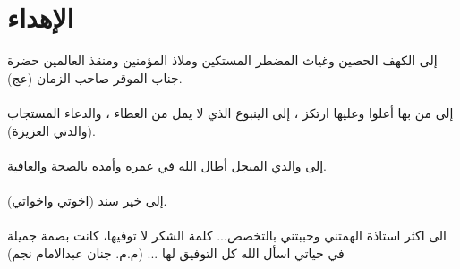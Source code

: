 \chapter*{الإهداء}
إلى الكهف الحصين وغياث المضطر المستكين وملاذ المؤمنين ومنقذ العالمين حضرة جناب الموقر صاحب الزمان (عج).\\
\\
إلى من بها أعلوا وعليها ارتكز ، إلى الينبوع الذي لا يمل من العطاء ، والدعاء المستجاب (والدتي العزيزة).\\
\\
إلى والدي المبجل أطال الله في عمره وأمده بالصحة والعافية.\\
\\
إلى خير سند (اخوتي واخواتي).\\
\\
الى اكثر استاذة الهمتني وحببتني بالتخصص... كلمة الشكر لا توفيها، كانت بصمة جميلة في حياتي اسأل الله كل التوفيق لها ... (م.م. جنان عبدالامام نجم)
